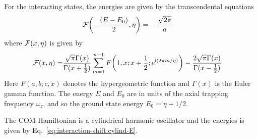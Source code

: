 For the interacting states,
the energies are given by the transcendental equations~\cite{idziaszek_analytical_2006}
\begin{align*}
  \mathcal{F}{\left({-\frac{{\left({E-E_0}\right)}}{2}, \eta}\right)}=&-\frac{\sqrt{2\pi}}{a}
\end{align*}
where $\mathcal{F}{\left({x, \eta}\right)}$ is given by
\begin{align*}
  \mathcal{F}{\left({x, \eta}\right)}=
  &\frac{\sqrt{\pi} \Gamma(x)}{\Gamma(x+\frac{1}{2})}
    \sum_{m=1}^{n-1} F{\left({1,x;x+\frac{1}{2} ; e^{\mathrm{i}(2\pi m/ \eta)}}\right)}
    -\frac{2 \sqrt{\pi} \Gamma(x)}{\Gamma(x-\frac{1}{2})}
\end{align*}
Here $F(a,b;c,x)$ denotes the hypergeometric function
and $\Gamma(x)$ is the Euler gamma function.
The energy $E$ and $E_0$ are in units of the axial trapping frequency $\omega_z$,
and so the ground state energy $E_0 = \eta + 1/2$.

The COM Hamiltonian is a cylindrical harmonic oscillator and the energies is given by
Eq.~\ref{eq:interaction-shift:cylind-E}.

